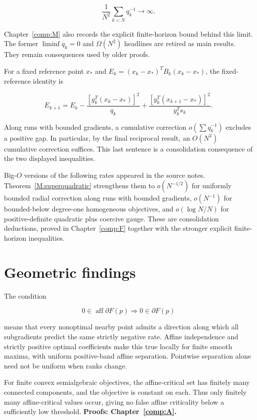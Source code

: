 \[\boxed{\frac1{N^2}\sum_{k<N}q_k^{-1}\to\infty.}\]

Chapter~\ref{comp:M} also records the explicit finite-horizon bound behind this limit. The former \(\liminf q_k=0\) and \(\Omega(N^2)\) headlines are retired as main results. They remain consequences used by older proofs.

For a fixed reference point \(x_*\) and \(E_k=(x_k-x_*)^TB_k(x_k-x_*)\), the fixed-reference identity is

\[E_{k+1}=E_k-\frac{[g_k^T(x_k-x_*)]^2}{q_k}
+\frac{[y_k^T(x_{k+1}-x_*)]^2}{y_k^Ts_k}.\]

Along runs with bounded gradients, a cumulative correction \(o(\sum q_k^{-1})\) excludes a positive gap. In particular, by the final reciprocal result, an \(O(N^2)\) cumulative correction suffices. This last sentence is a consolidation consequence of the two displayed inequalities.

Big-\(O\) versions of the following rates appeared in the source notes. Theorem~\ref{M:superquadratic} strengthens them to \(o(N^{-1/2})\) for uniformly bounded radial correction along runs with bounded gradients, \(o(N^{-1})\) for bounded-below degree-one homogeneous objectives, and \(o(\log N/N)\) for positive-definite quadratic plus coercive gauge. These are consolidation deductions, proved in Chapter~\ref{comp:F} together with the stronger explicit finite-horizon inequalities.



\section{Geometric findings}\label{geometric-findings-retained-independently-of-convergence}

The condition

\[0\in\operatorname{aff}\partial F(p)\Longrightarrow0\in\partial F(p)\]

means that every nonoptimal nearby point admits a direction along which all subgradients predict the same strictly negative rate. Affine independence and strictly positive optimal coefficients make this true locally for finite smooth maxima, with uniform positive-band affine separation. Pointwise separation alone need not be uniform when ranks change.

For finite convex semialgebraic objectives, the affine-critical set has finitely many connected components, and the objective is constant on each. Thus only finitely many affine-critical values occur, giving no false affine criticality below a sufficiently low threshold. \textbf{Proofs: Chapter~\ref{comp:A}.}


